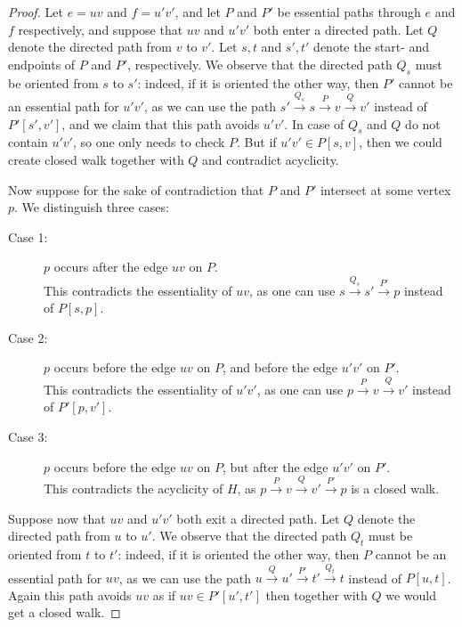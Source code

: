 \begin{proof}
Let $e=uv$ and $f=u'v'$, and let $P$ and $P'$ be essential paths through $e$ and $f$ respectively, and suppose that $uv$ and $u'v'$ both enter a directed path. Let $Q$ denote the directed path from $v$ to $v'$. Let $s,t$ and $s',t'$ denote the start- and endpoints of $P$ and $P'$, respectively. We observe that the directed path $Q_s$ must be oriented from $s$ to $s'$: indeed, if it is oriented the other way, then $P'$ cannot be an essential path for $u'v'$, as we can use the path $s'\xrightarrow{Q_s} s\xrightarrow{P} v \xrightarrow{Q} v'$ instead of $P'[s',v']$, and we claim that this path avoids $u'v'$. In case of $Q_s$ and $Q$ do not contain $u'v'$, so one only needs to check $P$. But if $u'v'\in P[s,v]$, then we could create closed walk together with $Q$ and contradict acyclicity.

Now suppose for the sake of contradiction that $P$ and $P'$ intersect at some vertex $p$. We distinguish three cases:
\begin{description}
\item[Case 1:] $p$ occurs after the edge $uv$ on $P$.\\
This contradicts the essentiality of $uv$, as one can use $s\xrightarrow{Q_s} s' \xrightarrow{P'} p$ instead of $P[s,p]$.
\item[Case 2:] $p$ occurs before the edge $uv$ on $P$, and before the edge $u'v'$ on $P'$.\\
This contradicts the essentiality of $u'v'$, as one can use $p\xrightarrow{P} v \xrightarrow{Q} v'$ instead of $P'[p,v']$.
\item[Case 3:] $p$ occurs before the edge $uv$ on $P$, but after the edge $u'v'$ on $P'$.\\
This contradicts the acyclicity of $H$, as $p \xrightarrow{P} v \xrightarrow{Q} v' \xrightarrow{P'} p$ is a closed walk.
\end{description}


Suppose now that $uv$ and $u'v'$ both exit a directed path. Let $Q$ denote the directed path from $u$ to $u'$. We observe that the directed path $Q_t$ must be oriented from $t$ to $t'$: indeed, if it is oriented the other way, then $P$ cannot be an essential path for $uv$, as we can use the path $u \xrightarrow{Q} u'\xrightarrow{P'} t' \xrightarrow{Q_t} t$ instead of $P[u,t]$. Again this path avoids $uv$ as if $uv\in P'[u',t']$ then together with $Q$ we would get a closed walk. 


\end{proof}
